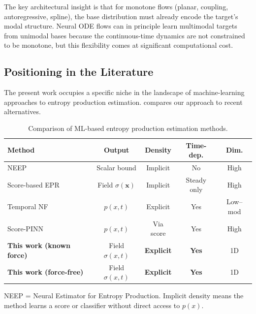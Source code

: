 The key architectural insight is that for monotone flows (planar, coupling, autoregressive, spline), the base distribution must already encode the target's modal structure.
Neural ODE flows can in principle learn multimodal targets from unimodal bases because the continuous-time dynamics are not constrained to be monotone, but this flexibility comes at significant computational cost.

\subsection{Positioning in the Literature}
\label{sec:positioning}

The present work occupies a specific niche in the landscape of machine-learning approaches to entropy production estimation.
 compares our approach to recent alternatives.

\begin{table}[htbp]
    \centering
    \begin{threeparttable}
        \caption{Comparison of ML-based entropy production estimation methods.}
        \label{tab:method_comparison}
        \begin{tabular}{l c c c c}
            \toprule
            \textbf{Method} & \textbf{Output} & \textbf{Density} & \textbf{Time-dep.} & \textbf{Dim.} \\
            \midrule
            NEEP~\cite{Kim2020} & Scalar bound & Implicit & No & High \\
            Score-based EPR~\cite{Boffi2024} & Field $\sigma(\mathbf{x})$ & Implicit & Steady only & High \\
            Temporal NF~\cite{Feng2022} & $p(x,t)$ & Explicit & Yes & Low--mod \\
            Score-PINN~\cite{Hu2024} & $p(x,t)$ & Via score & Yes & High \\
            \textbf{This work (known force)} & Field $\sigma(x,t)$ & \textbf{Explicit} & \textbf{Yes} & 1D \\
            \textbf{This work (force-free)} & Field $\sigma(x,t)$ & \textbf{Explicit} & \textbf{Yes} & 1D \\
            \bottomrule
        \end{tabular}
        \begin{tablenotes}
            \small
            \item NEEP = Neural Estimator for Entropy Production.
            Implicit density means the method learns a score or classifier without direct access to $p(x)$.
        \end{tablenotes}
    \end{threeparttable}
\end{table}

